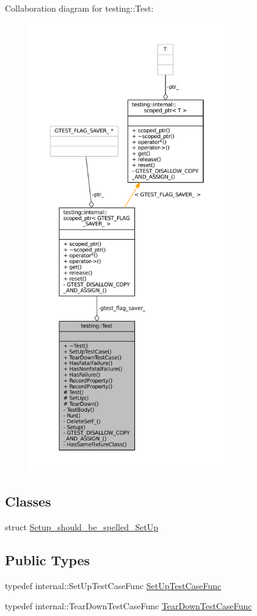 Collaboration diagram for testing\+:\+:Test\+:
\nopagebreak
\begin{figure}[H]
\begin{center}
\leavevmode
\includegraphics[height=550pt]{classtesting_1_1Test__coll__graph}
\end{center}
\end{figure}
\subsection*{Classes}
\begin{DoxyCompactItemize}
\item 
struct \hyperlink{structtesting_1_1Test_1_1Setup__should__be__spelled__SetUp}{Setup\+\_\+should\+\_\+be\+\_\+spelled\+\_\+\+Set\+Up}
\end{DoxyCompactItemize}
\subsection*{Public Types}
\begin{DoxyCompactItemize}
\item 
typedef internal\+::\+Set\+Up\+Test\+Case\+Func \hyperlink{classtesting_1_1Test_a5f2a051d1d99c9b784c666c586186cf9}{Set\+Up\+Test\+Case\+Func}
\item 
typedef internal\+::\+Tear\+Down\+Test\+Case\+Func \hyperlink{classtesting_1_1Test_aa0f532e93b9f3500144c53f31466976c}{Tear\+Down\+Test\+Case\+Func}
\end{DoxyCompactItemize}
